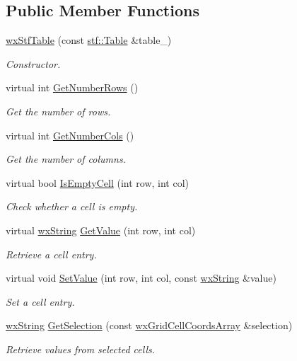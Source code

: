 \subsection*{Public Member Functions}
\begin{DoxyCompactItemize}
\item 
\hyperlink{classwxStfTable_a4d0c5d37e5d62ff9be2988394acd01f6}{wxStfTable} (const \hyperlink{classstf_1_1Table}{stf::Table} \&table\_\-)
\begin{DoxyCompactList}\small\item\em Constructor. \item\end{DoxyCompactList}\item 
virtual int \hyperlink{classwxStfTable_a5f9b48e59ecf5a71119cf2be6fb147c1}{GetNumberRows} ()
\begin{DoxyCompactList}\small\item\em Get the number of rows. \item\end{DoxyCompactList}\item 
virtual int \hyperlink{classwxStfTable_a30853718d7c0ed821359ead290c2f34c}{GetNumberCols} ()
\begin{DoxyCompactList}\small\item\em Get the number of columns. \item\end{DoxyCompactList}\item 
virtual bool \hyperlink{classwxStfTable_a72cc04a488294853caf3286524b26e66}{IsEmptyCell} (int row, int col)
\begin{DoxyCompactList}\small\item\em Check whether a cell is empty. \item\end{DoxyCompactList}\item 
virtual \hyperlink{classwxString}{wxString} \hyperlink{classwxStfTable_a8fe17229df07b1bdeec22ffcc2f8a5bf}{GetValue} (int row, int col)
\begin{DoxyCompactList}\small\item\em Retrieve a cell entry. \item\end{DoxyCompactList}\item 
virtual void \hyperlink{classwxStfTable_a6db01408c1154f26abfccc6dce873753}{SetValue} (int row, int col, const \hyperlink{classwxString}{wxString} \&value)
\begin{DoxyCompactList}\small\item\em Set a cell entry. \item\end{DoxyCompactList}\item 
\hyperlink{classwxString}{wxString} \hyperlink{classwxStfTable_a97aa083819bfde8f8a3acb06147008af}{GetSelection} (const \hyperlink{classwxGridCellCoordsArray}{wxGridCellCoordsArray} \&selection)
\begin{DoxyCompactList}\small\item\em Retrieve values from selected cells. \item\end{DoxyCompactList}\end{DoxyCompactItemize}


